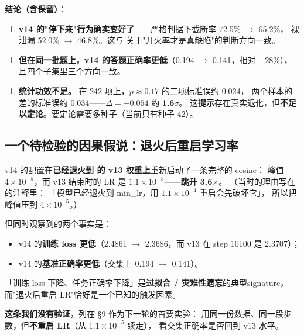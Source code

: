\documentclass[11pt,openany]{ctexart}
\begin{document}
\textbf{结论（含保留）}：

\begin{enumerate}
  \item \textbf{v14 的"停下来"行为确实变好了}——严格判据下截断率 72.5\% $\rightarrow$ 65.2\%， 裸泄漏 52.0\% $\rightarrow$ 46.8\%。这与  关于"开火率才是真缺陷"的判断方向一致。
\end{enumerate}
\begin{enumerate}
  \item \textbf{但在同一批题上，v14 的答题正确率更低}（0.194 $\rightarrow$ 0.141，相对 $-$28\%）， 且四个子集里三个方向一致。
\end{enumerate}
\begin{enumerate}
  \item \textbf{统计功效不足。} 在 242 项上，$p\approx0.17$ 的二项标准误约 0.024， 两个样本的差的标准误约 0.034——$\Delta = -0.054$ 约 \textbf{1.6$\sigma$}。 这\textbf{提示}存在真实退化，但\textbf{不足以定论}。要定论需要多种子（当前只有种子 42）。
\end{enumerate}

\subsection{一个待检验的因果假说：退火后重启学习率}

v14 的配置在\textbf{已经退火到  的 v13 权重上}重新启动了一条完整的 cosine： 峰值 $4\times10^{-5}$，而 v13 结束时的 LR 是 $1.1\times10^{-5}$——\textbf{跳升 3.6$\times$}。 （当时的理由写在  的注释里： 「模型已经退火到 min\_lr，用 $1.1\times10^{-4}$ 重启会先破坏它」， 所以把峰值压到 $4\times10^{-5}$。）

但同时观察到的两个事实是：

\begin{itemize}
  \item v14 的\textbf{训练 loss 更低}（2.4861 $\rightarrow$ 2.3686，而 v13 在 step 10100 是 2.3707）；
\end{itemize}
\begin{itemize}
  \item v14 的\textbf{基准正确率更低}（交集上 0.194 $\rightarrow$ 0.141）。
\end{itemize}

「训练 loss 下降、任务正确率下降」是\textbf{过拟合 / 灾难性遗忘}的典型signature， 而"退火后重启 LR"恰好是一个已知的触发因素。

\textbf{这条我们没有验证}，列在 §9 作为下一轮的首要实验： 用同一份数据、同一段步数，但\textbf{不重启 LR}（从 $1.1\times10^{-5}$ 续走）， 看交集正确率是否回到 v13 水平。
\end{document}
